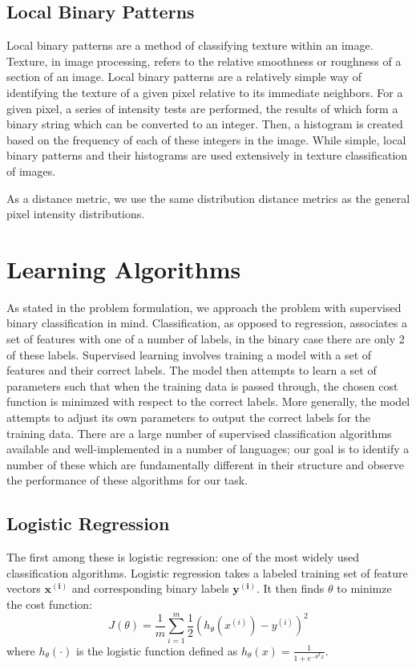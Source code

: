 \subsection{Local Binary Patterns}
Local binary patterns are a method of classifying texture within an image.
Texture, in image processing, refers to the relative smoothness or roughness of a section of an image.
Local binary patterns are a relatively simple way of identifying the texture of a given pixel relative to its immediate neighbors.
For a given pixel, a series of intensity tests are performed, the results of which form a binary string which can be converted to an integer.
Then, a histogram is created based on the frequency of each of these integers in the image.
While simple, local binary patterns and their histograms are used extensively in texture classification of images.

As a distance metric, we use the same distribution distance metrics as the general pixel intensity distributions.




\section{Learning Algorithms}

As stated in the problem formulation, we approach the problem with supervised binary classification in mind.
Classification, as opposed to regression, associates a set of features with one of a number of labels, in the binary case there are only 2 of these labels.
Supervised learning involves training a model with a set of features and their correct labels.
The model then attempts to learn a set of parameters such that when the training data is passed through, the chosen cost function is minimzed with respect to the correct labels.
More generally, the model attempts to adjust its own parameters to output the correct labels for the training data.
There are a large number of supervised classification algorithms available and well-implemented in a number of languages; our goal is to identify a number of these which are fundamentally different in their structure and observe the performance of these algorithms for our task.

\subsection{Logistic Regression}
The first among these is logistic regression: one of the most widely used classification algorithms.
Logistic regression takes a labeled training set of feature vectors $\mathbf{x^{(i)}}$ and corresponding binary labels $\mathbf{y^{(i)}}$.
It then finds $\theta$ to minimze the cost function:
\begin{equation}
J(\theta) = \frac{1}{m} \sum_{i=1}^m\frac{1}{2} \left( h_\theta \left( x^{(i)} \right) - y^{(i)} \right)^2
\end{equation}
where $h_\theta (\cdot)$ is the logistic function defined as $h_\theta(x) = \frac{1}{1+e^{-\theta^Tx}}$.

